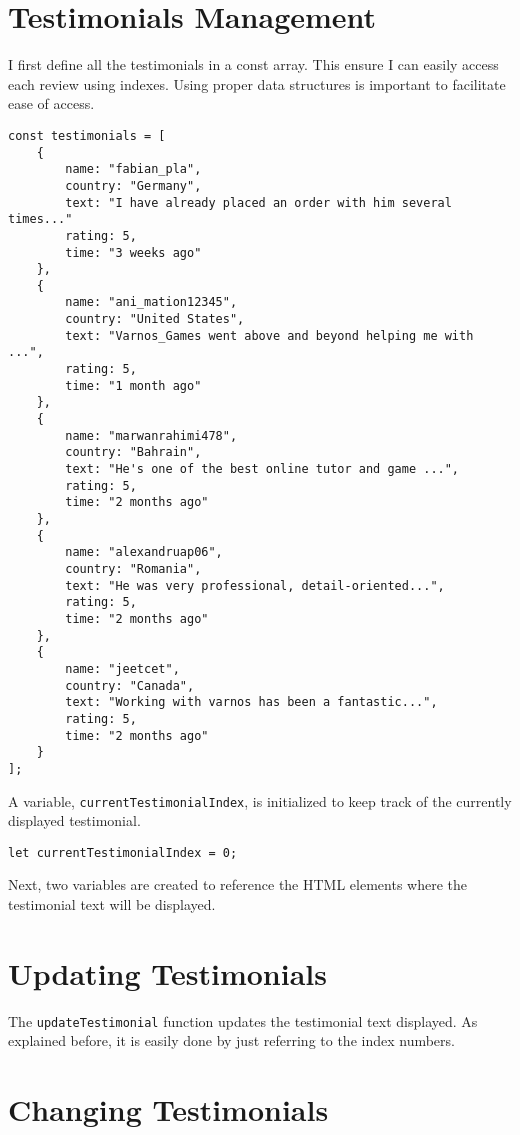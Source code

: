 \documentclass[15pt]{report}
\begin{document}
\section{Testimonials Management}
I first define all the testimonials in a const array. This ensure I can easily access each review using indexes. Using proper data structures is important to facilitate ease of access.
\begin{lstlisting}
const testimonials = [
    {
        name: "fabian_pla",
        country: "Germany",
        text: "I have already placed an order with him several times..."
        rating: 5,
        time: "3 weeks ago"
    },
    {
        name: "ani_mation12345",
        country: "United States",
        text: "Varnos_Games went above and beyond helping me with ...",
        rating: 5,
        time: "1 month ago"
    },
    {
        name: "marwanrahimi478",
        country: "Bahrain",
        text: "He's one of the best online tutor and game ...",
        rating: 5,
        time: "2 months ago"
    },
    {
        name: "alexandruap06",
        country: "Romania",
        text: "He was very professional, detail-oriented...",
        rating: 5,
        time: "2 months ago"
    },
    {
        name: "jeetcet",
        country: "Canada",
        text: "Working with varnos has been a fantastic...",
        rating: 5,
        time: "2 months ago"
    }
];
\end{lstlisting}

A variable, \texttt{currentTestimonialIndex}, is initialized to keep track of the currently displayed testimonial.

\begin{lstlisting}
let currentTestimonialIndex = 0;
\end{lstlisting}

Next, two variables are created to reference the HTML elements where the testimonial text will be displayed.

\section{Updating Testimonials}
The \texttt{updateTestimonial} function updates the testimonial text displayed. As explained before, it is easily done by just referring to the index numbers. 


\section{Changing Testimonials}
\end{document}
